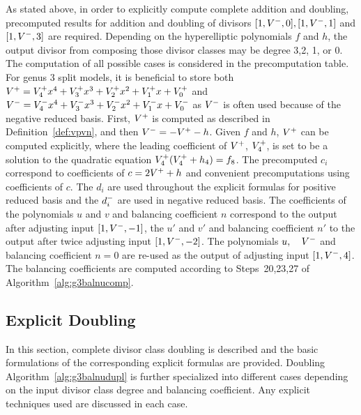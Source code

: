 As stated above, in order to explicitly compute complete addition and doubling,
precomputed results for addition and doubling of divisors $[1,V^{-},0], [1,V^{-},1]$
and $[1,V^{-},3]$ are required. Depending on the hyperelliptic polynomials $f$ and
$h$, the output divisor from composing those divisor classes may be degree 3,2,
1, or 0. The computation of all possible cases is considered in the
precomputation table. For genus 3 split models, it is beneficial to store both
$V^{+} = V^{+}_4x^4 + V^{+}_3x^3 + V^{+}_2x^2 + V^{+}_1x + V^{+}_0$ and  $V^{-} = V^{-}_4x^4 +
V^{-}_3x^3 + V^{-}_2x^2 + V^{-}_1x + V^{-}_0$ as $V^{-}$ is often used because of the
negative reduced basis. First, $V^{+}$ is computed as described in
Definition~\ref{def:vpvn}, and then $V^{-} = - V^{+} - h$. Given $f$ and $h$, $V^{+}$
can be computed explicitly, where the leading coefficient of $V^{+}$, $V^{+}_4$, is
set to be a solution to the quadratic equation $V^{+}_4(V^{+}_4 + h_4) = f_8$. The
precomputed $c_i$ correspond to coefficients of $c = 2V^{+} + h$ and convenient
precomputations using coefficients of $c$. The $d_i$ are used throughout the
explicit formulas for positive reduced basis and the $d^{-}_i$ are used in
negative reduced basis. The coefficients of the polynomials $u$ and $v$ and
balancing coefficient $n$ correspond to the output after adjusting input
$[1,V^{-},-1]$, the $u'$ and $v'$ and balancing coefficient $n'$ to the output
after twice adjusting input $[1,V^{-},-2]$. The polynomials $u, \quad V^{-}$ and
balancing coefficient $n=0$ are re-used as the output of adjusting input
$[1,V^{-},4]$. The balancing coefficients are computed according to Steps~20,23,27
of Algorithm~\ref{alg:g3balnucomp}.

\subsection{Explicit Doubling}\label{sec:g3SPLITDBL}
In this section, complete divisor class doubling is described and the basic
formulations of the corresponding explicit formulas are provided. Doubling
Algorithm~\ref{alg:g3balnudupl} is further specialized into different cases
depending on the input divisor class degree and balancing coefficient. Any
explicit techniques used are discussed in each case. 

